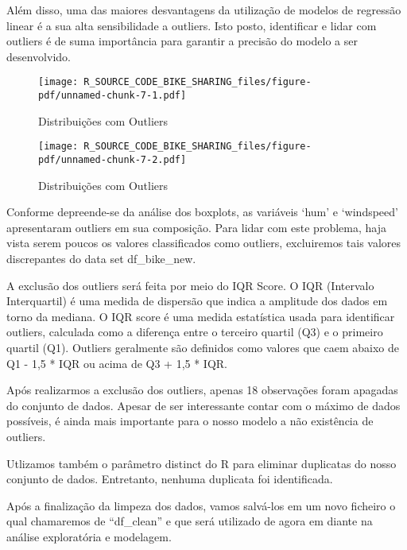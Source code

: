 \documentclass[
  letterpaper,
  DIV=11,
  numbers=noendperiod]{scrartcl}
\begin{document}
Além disso, uma das maiores desvantagens da utilização de modelos de
regressão linear é a sua alta sensibilidade a outliers. Isto posto,
identificar e lidar com outliers é de suma importância para garantir a
precisão do modelo a ser desenvolvido.

\begin{figure}[H]

{\centering \texttt{[image: R\_SOURCE\_CODE\_BIKE\_SHARING\_files/figure-pdf/unnamed-chunk-7-1.pdf]}

}

\caption{Distribuições com Outliers}

\end{figure}%

\begin{figure}[H]

{\centering \texttt{[image: R\_SOURCE\_CODE\_BIKE\_SHARING\_files/figure-pdf/unnamed-chunk-7-2.pdf]}

}

\caption{Distribuições com Outliers}

\end{figure}%

Conforme depreende-se da análise dos boxplots, as variáveis `hum' e
`windspeed' apresentaram outliers em sua composição. Para lidar com este
problema, haja vista serem poucos os valores classificados como
outliers, excluiremos tais valores discrepantes do data set
df\_bike\_new.

A exclusão dos outliers será feita por meio do IQR Score. O IQR
(Intervalo Interquartil) é uma medida de dispersão que indica a
amplitude dos dados em torno da mediana. O IQR score é uma medida
estatística usada para identificar outliers, calculada como a diferença
entre o terceiro quartil (Q3) e o primeiro quartil (Q1). Outliers
geralmente são definidos como valores que caem abaixo de Q1 - 1,5 * IQR
ou acima de Q3 + 1,5 * IQR.

Após realizarmos a exclusão dos outliers, apenas 18 observações foram
apagadas do conjunto de dados. Apesar de ser interessante contar com o
máximo de dados possíveis, é ainda mais importante para o nosso modelo a
não existência de outliers.

Utlizamos também o parâmetro distinct do R para eliminar duplicatas do
nosso conjunto de dados. Entretanto, nenhuma duplicata foi identificada.

Após a finalização da limpeza dos dados, vamos salvá-los em um novo
ficheiro o qual chamaremos de ``df\_clean'' e que será utilizado de
agora em diante na análise exploratória e modelagem.
\end{document}
